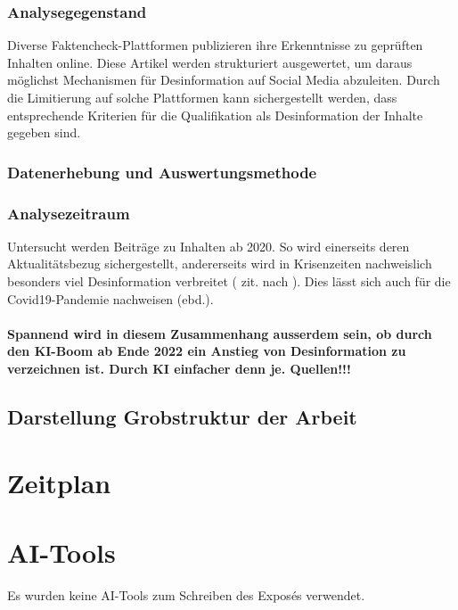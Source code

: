 \documentclass[12pt,a4paper]{article}        %
\begin{document}
\subsubsection{Analysegegenstand}
Diverse Faktencheck-Plattformen publizieren ihre Erkenntnisse zu geprüften Inhalten online. Diese Artikel werden strukturiert ausgewertet, um daraus möglichst Mechanismen für Desinformation auf Social Media abzuleiten. Durch die Limitierung auf solche Plattformen kann sichergestellt werden, dass entsprechende Kriterien für die Qualifikation als Desinformation der Inhalte gegeben sind.

\subsubsection{Datenerhebung und Auswertungsmethode}
\subsubsection{Analysezeitraum}
Untersucht werden Beiträge zu Inhalten ab 2020. So wird einerseits deren Aktualitätsbezug sichergestellt, andererseits wird in Krisenzeiten nachweislich besonders viel Desinformation verbreitet (\textcite{tandoc_defining_2018} zit. nach \textcite[2]{ceron_fake_2021}). Dies lässt sich auch für die Covid19-Pandemie nachweisen (ebd.).

\paragraph{\color{red}Spannend wird in diesem Zusammenhang ausserdem sein, ob durch den KI-Boom ab Ende 2022 ein Anstieg von Desinformation zu verzeichnen ist. Durch KI einfacher denn je. Quellen!!!}


\subsection{Darstellung Grobstruktur der Arbeit}

\section{Zeitplan}

\section{AI-Tools}
Es wurden keine AI-Tools zum Schreiben des Exposés verwendet.

\pagebreak
\end{document}
